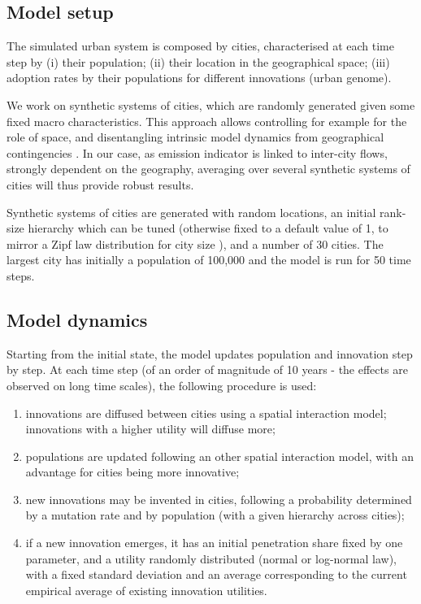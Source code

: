 \documentclass{article}
\begin{document}
\subsection{Model setup}

The simulated urban system is composed by cities, characterised at each time step by (i) their population; (ii) their location in the geographical space; (iii) adoption rates by their populations for different innovations (urban genome).

We work on synthetic systems of cities, which are randomly generated given some fixed macro characteristics. This approach allows controlling for example for the role of space, and disentangling intrinsic model dynamics from geographical contingencies \cite{raimbault2019space}. In our case, as emission indicator is linked to inter-city flows, strongly dependent on the geography, averaging over several synthetic systems of cities will thus provide robust results.

Synthetic systems of cities are generated with random locations, an initial rank-size hierarchy which can be tuned (otherwise fixed to a default value of 1, to mirror a Zipf law distribution for city size \cite{cottineau2017metazipf}), and a number of 30 cities. The largest city has initially a population of 100,000 and the model is run for 50 time steps. 


\subsection{Model dynamics}

Starting from the initial state, the model updates population and innovation step by step. At each time step (of an order of magnitude of 10 years - the effects are observed on long time scales), the following procedure is used:

\begin{enumerate}
	\item innovations are diffused between cities using a spatial interaction model; innovations with a higher utility will diffuse more;
	\item populations are updated following an other spatial interaction model, with an advantage for cities being more innovative;
	\item new innovations may be invented in cities, following a probability determined by a mutation rate and by population (with a given hierarchy across cities);
	\item if a new innovation emerges, it has an initial penetration share fixed by one parameter, and a utility randomly distributed (normal or log-normal law), with a fixed standard deviation and an average corresponding to the current empirical average of existing innovation utilities.
\end{enumerate}
\end{document}
